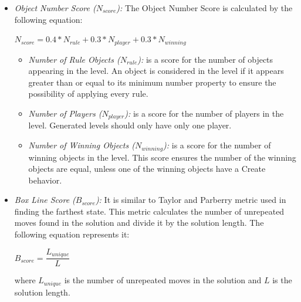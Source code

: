 \documentclass[letterpaper]{article}
\begin{document}
\begin{itemize}
	\item \emph{Object Number Score ($N_{score}$):} The Object Number Score is calculated by the following equation:
	\begin{center}$N_{score} = 0.4 * N_{rule} + 0.3 * N_{player} + 0.3 * N_{winning}$\end{center}
	\begin{itemize}
		\item \emph{Number of Rule Objects ($N_{rule}$):} is a score for the number of objects appearing in the level. An object is considered in the level if it appears greater than or equal to its minimum number property to ensure the possibility of applying every rule.
		\item \emph{Number of Players ($N_{player}$):} is a score for the number of players in the level. Generated levels should only have only one player.
		\item \emph{Number of Winning Objects ($N_{winning}$):} is a score for the number of winning objects in the level. This score ensures the number of the winning objects are equal, unless one of the winning objects have a Create behavior.
	\end{itemize}
	
	\item \emph{Box Line Score ($B_{score}$):} It is similar to Taylor and Parberry metric\cite{sokobanLevelGenerationNew} used in finding the farthest state. This metric calculates the number of unrepeated moves found in the solution and divide it by the solution length. The following equation represents it:
	\begin{center}$B_{score} = \dfrac{L_{unique}}{L}$\end{center}
	where $L_{unique}$ is the number of unrepeated moves in the solution and $L$ is the solution length.
	

\end{itemize}
\end{document}
